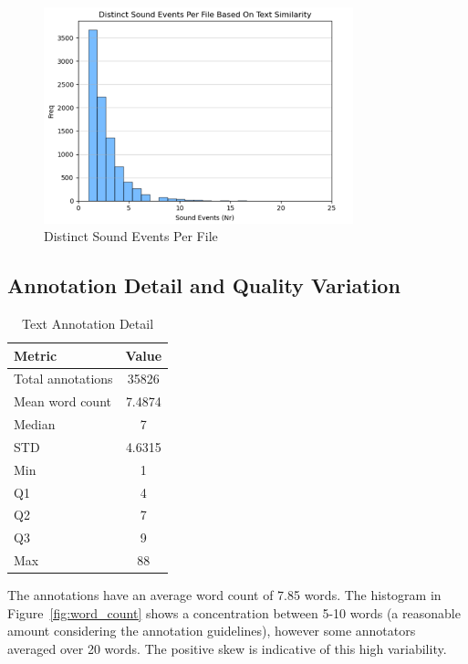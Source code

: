 \documentclass{article}
\begin{document}
\begin{figure}[H]
  \centering
  \includegraphics[width=0.8\textwidth]{figures/annotation_quality/distinct_sound_events_per_file.png}
  \caption{Distinct Sound Events Per File}
  \label{fig:events_per_file}
\end{figure}

\subsection{Annotation Detail and Quality Variation}

\begin{table}[H]
  \caption{Text Annotation Detail}
  \label{tab:text_detail}
  \centering
  \begin{tabular}{lc}
    \toprule
    Metric & Value \\
    \midrule
    Total annotations & 35826 \\
    Mean word count & 7.4874 \\
    Median & 7 \\
    STD & 4.6315 \\
    Min & 1 \\
    Q1 & 4 \\
    Q2 & 7 \\
    Q3 & 9 \\
    Max & 88 \\
    \bottomrule
  \end{tabular}
\end{table}

The annotations have an average word count of 7.85 words. The histogram in Figure~\ref{fig:word_count} shows a concentration between 5-10 words (a reasonable amount considering the annotation guidelines), however some annotators averaged over 20 words. The positive skew is indicative of this high variability.
\end{document}
